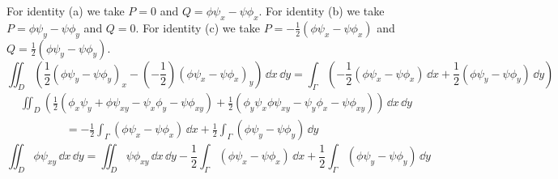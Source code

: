 \begin{Solution}
  For identity (a) we take $P = 0$ and $Q = \phi \psi_x - \psi \phi_x$.
  For identity (b) we take $P = \phi \psi_y - \psi \phi_y$ and $Q = 0$.
  For identity (c) we take $P = - \frac{1}{2} (\phi \psi_x - \psi \phi_x )$
  and $Q = \frac{1}{2} (\phi \psi_y - \psi \phi_y)$.
  \[
  \iint_D \left( \frac{1}{2} (\phi \psi_y - \psi \phi_y)_x
    - \left( - \frac{1}{2} \right) (\phi \psi_x - \psi \phi_x)_y \right)
  \,\dd x\,\dd y
  = \int_\Gamma \left( - \frac{1}{2} (\phi \psi_x - \psi \phi_x )\,\dd x
    + \frac{1}{2} (\phi \psi_y - \psi \phi_y) \,\dd y \right)
  \]
  \begin{align*}
    &\iint_D \left( \frac{1}{2} (\phi_x \psi_y + \phi \psi_{x y} 
      - \psi_x \phi_y - \psi \phi_{x y})
      + \frac{1}{2} (\phi_y \psi_x \phi \psi_{x y} 
      - \psi_y \phi_x - \psi \phi_{x y} ) \right)
    \,\dd x\,\dd y \\
    &\qquad\qquad
    = - \frac{1}{2} \int_\Gamma (\phi \psi_x - \psi \phi_x ) \,\dd x 
    + \frac{1}{2} \int_\Gamma (\phi \psi_y - \psi \phi_y ) \,\dd y 
  \end{align*}
  \[
  \iint_D \phi \psi_{x y} \,\dd x \,\dd y
  = \iint_D \psi \phi_{x y} \,\dd x \,\dd y
  - \frac{1}{2} \int_\Gamma (\phi \psi_x - \psi \phi_x ) \,\dd x 
  + \frac{1}{2} \int_\Gamma (\phi \psi_y - \psi \phi_y ) \,\dd y
  \]



\end{Solution}
